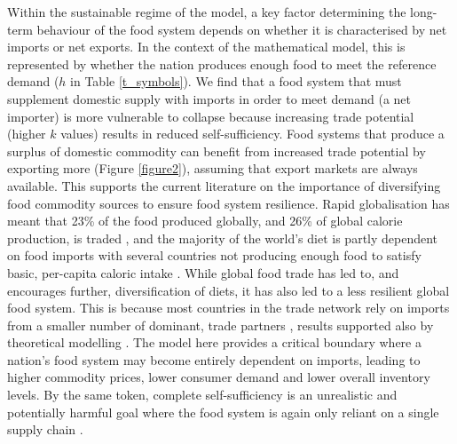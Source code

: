 \documentclass[12pt]{article}
\begin{document}
Within the sustainable regime of the model, a key factor determining the long-term behaviour of the food system depends on whether it is characterised by net imports or net exports. In the context of the mathematical model, this is represented by whether the nation produces enough food to meet the reference demand ($h$ in Table \ref{t_symbols}). We find that a food system that must supplement domestic supply with imports in order to meet demand (a net importer) is more vulnerable to collapse because increasing trade potential (higher $k$ values) results in reduced self-sufficiency. Food systems that produce a surplus of domestic commodity can benefit from increased trade potential by exporting more (Figure \ref{figure2}), assuming that export markets are always available. This supports the current literature on the importance of diversifying food commodity sources to ensure food system resilience. Rapid globalisation has meant that 23\% of the food produced globally, and 26\% of global calorie production, is traded \cite{dodorico2014,tu2019,poppy2019}, and the majority of the world's diet is partly dependent on food imports \cite{kummu2020} with several countries not producing enough food to satisfy basic, per-capita caloric intake \cite{dodorico2014}. While global food trade has led to, and encourages further, diversification of diets, it has also led to a less resilient global food system. This is because most countries in the trade network rely on imports from a smaller number of dominant, trade partners \cite{kummu2020}, results supported also by theoretical modelling \cite{tu2019}. The model here provides a critical boundary where a nation's food system may become entirely dependent on imports, leading to higher commodity prices, lower consumer demand and lower overall inventory levels. By the same token, complete self-sufficiency is an unrealistic and potentially harmful goal where the food system is again only reliant on a single supply chain \cite{helm2017}.
\end{document}
